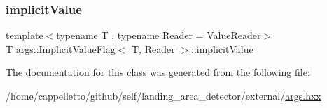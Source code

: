 \subsubsection{\texorpdfstring{implicit\+Value}{implicitValue}}
{\footnotesize\ttfamily template$<$typename T , typename Reader  = Value\+Reader$>$ \\
T \hyperlink{classargs_1_1_implicit_value_flag}{args\+::\+Implicit\+Value\+Flag}$<$ T, Reader $>$\+::implicit\+Value\hspace{0.3cm}{\ttfamily [protected]}}



The documentation for this class was generated from the following file\+:\begin{DoxyCompactItemize}
\item 
/home/cappelletto/github/self/landing\+\_\+area\+\_\+detector/external/\hyperlink{args_8hxx}{args.\+hxx}\end{DoxyCompactItemize}
